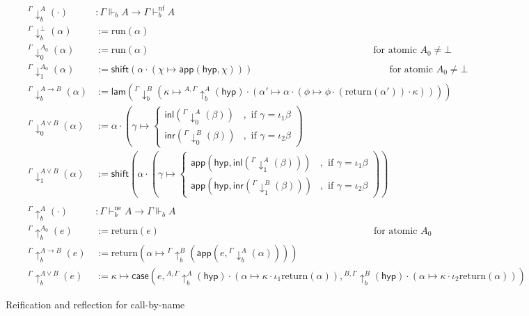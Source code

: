 \documentclass{eptcs}
\newcommand{\hyp}{\mathsf{hyp}}
\newcommand{\inl}[1]{\mathsf{inl}{(#1)}}
\newcommand{\inr}[1]{\mathsf{inr}{(#1)}}
\newcommand{\lam}[1]{\mathsf{lam}{(#1)}}
\newcommand{\shift}[1]{\mathsf{shift}{(#1)}}
\newcommand{\casemy}[3]{\mathsf{case}({#1},{#2},{#3})}
\newcommand{\app}[2]{\mathsf{app}({#1},{#2})}
\newcommand{\normal}{{\!\!\text{nf}}}
\newcommand{\neutral}{{\!\!\text{ne}}}
\newcommand{\forces}[3]{{#1}\Vdash_{#2}{#3}}
\newcommand{\run}[1]{\text{run}{(#1)}}
\newcommand{\ret}[1]{\text{return}{(#1)}}
\newcommand{\lsup}[1]{{{^#1}}\!\!\!}
\newcommand{\reify}[4]{\lsup{#1}\downarrow_{#2}^{\!{#3}}({#4})}
\newcommand{\reflect}[4]{\lsup{#1}\uparrow_{#2}^{\!{#3}}({#4})}
\theoremstyle{definition}
\theoremstyle{plain}
\theoremstyle{remark}
\begin{document}
\begin{figure*}
\centering
  \begin{align*}
    \reify{\Gamma}{b}{A}{\cdot} &: \forces{\Gamma}{b}{A} \to \Gamma\vdash^\normal_b A\\
    \reify{\Gamma}{b}{\bot}{\alpha} &:= \run{\alpha}\\
    \reify{\Gamma}{0}{A_0}{\alpha} &:= \run{\alpha}\quad\quad\quad\qquad\qquad\qquad\qquad\qquad\qquad\qquad\qquad\qquad\qquad \text{for atomic }A_0\neq \bot\\
    \reify{\Gamma}{1}{A_0}{\alpha} &:= \shift{\alpha\cdot(\chi\mapsto\app{\hyp}{\chi})}\qquad\qquad\qquad\qquad\qquad\qquad\qquad \text{for atomic }A_0\neq \bot\\
    \reify{\Gamma}{b}{A\to B}{\alpha} &:= \lam{\reify{\Gamma}{b}{B}{\kappa\mapsto \reflect{{A,\Gamma}}{b}{A}{\hyp}\cdot (\alpha'\mapsto\alpha\cdot(\phi\mapsto\phi\cdot(\ret{\alpha'})\cdot\kappa))}}\\
    \reify{\Gamma}{0}{A\vee B}{\alpha} &:= \alpha\cdot\left(\gamma\mapsto\left\{
      \begin{array}{ll}
        \inl{\reify{{\Gamma}}{0}{A}{\beta}} & ,\text{ if } \gamma=\iota_1\beta\\
        \inr{\reify{{\Gamma}}{0}{B}{\beta}} & ,\text{ if } \gamma=\iota_2\beta
      \end{array}
    \right.\right)\\
    \reify{\Gamma}{1}{A\vee B}{\alpha} &:=\shift{\alpha\cdot\left(\gamma\mapsto\left\{
      \begin{array}{ll}
        \app{\hyp}{\inl{\reify{{\Gamma}}{1}{A}{\beta}}} & ,\text{ if } \gamma=\iota_1\beta\\
        \app{\hyp}{\inr{\reify{{\Gamma}}{1}{B}{\beta}}} & ,\text{ if } \gamma=\iota_2\beta
      \end{array}
    \right.\right)}\\
    ~ & ~\\
    \reflect{\Gamma}{b}{A}{\cdot} &: \Gamma\vdash^\neutral_b A\to \forces{\Gamma}{b}{A}\\
    \reflect{\Gamma}{b}{A_0}{e} &:= \ret{e}\quad\quad\qquad\qquad\qquad\qquad\qquad\qquad\qquad\qquad\qquad\qquad \text{for atomic }A_0\\
    \reflect{\Gamma}{b}{A\to B}{e} &:= \ret{\alpha\mapsto\reflect{\Gamma}{b}{B}{\app{e}{\reify{\Gamma}{b}{A}{\alpha}}}}\\
    \reflect{\Gamma}{b}{A\vee B}{e} &:= \kappa\mapsto\casemy{e}{\reflect{{A,\Gamma}}{b}{A}{\hyp}\cdot(\alpha\mapsto\kappa\cdot\iota_1\ret{\alpha})}{\reflect{{B,\Gamma}}{b}{B}{\hyp}\cdot(\alpha\mapsto\kappa\cdot\iota_2\ret{\alpha})}
  \end{align*}
  \caption{Reification and reflection for call-by-name}
  \label{fig:reifycbn}
\end{figure*}
\end{document}
